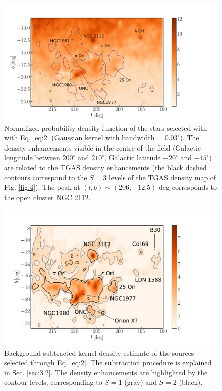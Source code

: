 \documentclass[twocolumn]{aa}
\begin{document}
\begin{figure}
\includegraphics[width = \hsize, keepaspectratio]{fig8_labels.pdf}%
\caption{Normalized probability density function of the stars selected with with Eq. \eqref{eq:2} (Gaussian kernel with bandwidth = $0.03^{\circ}$). The density enhancements visible in the centre of the field (Galactic longitude between $200^{\circ}$ and $210^{\circ}$, Galactic latitude $-20^{\circ}$ and $-15^{\circ}$) are related to the TGAS density enhancements (the black dashed contours correspond to the $S = 3$ levels of the TGAS density map of Fig. \ref{fig:4}).  The peak at $(l, b) \sim (206, -12.5)$ deg corresponds to  the open cluster NGC 2112. 
}
\label{fig:7}
\end{figure}
\begin{figure}
\includegraphics[width = \textwidth, keepaspectratio]{fig9_labels.pdf}
\caption{Background subtracted kernel density estimate of the sources selected through Eq. \eqref{eq:2}. The subtraction procedure is explained in Sec. \ref{sec:3.2}. The density enhancements are highlighted by the contour levels, corresponding to $S =1$ (gray) and $S = 2$ (black).
}
\label{fig:8}
\end{figure}
\end{document}
